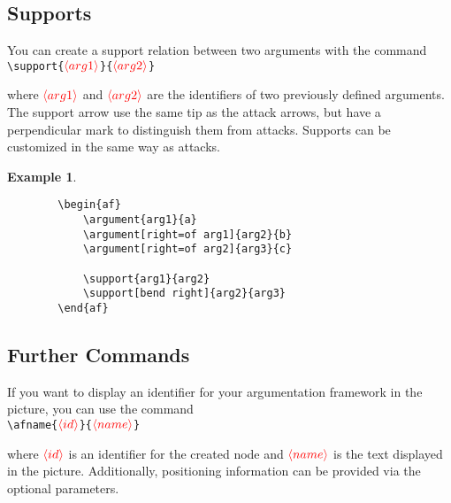 \documentclass{article}
\newcommand{\opt}[2][red]{\ensuremath{\textcolor{#1}{\langle #2\rangle}}}
\newtheorem{example}{Example}
\begin{document}
\subsection{Supports}
    You can create a support relation between two arguments with the command\\

    \noindent
    \verb|\support{|\opt{arg1}\verb|}{|\opt{arg2}\verb|}|

    \begin{list}{}{\leftmargin=\parindent\rightmargin=0pt}
    \item where \opt{arg1} and \opt{arg2} are the identifiers of two previously defined arguments.
    The support arrow use the same tip as the attack arrows, but have a perpendicular mark to distinguish them from attacks.
    Supports can be customized in the same way as attacks.
    \end{list}
    \begin{example}~
    \begin{verbatim}
        \begin{af}
            \argument{arg1}{a}
            \argument[right=of arg1]{arg2}{b}
            \argument[right=of arg2]{arg3}{c}
    
            \support{arg1}{arg2}
            \support[bend right]{arg2}{arg3}
        \end{af}    
    \end{verbatim}

    \begin{center}
        \begin{af}
    
        \end{af}    
    \end{center}
    \end{example}


\subsection{Further Commands}
    If you want to display an identifier for your argumentation framework in the picture, you can use the command\\

    \noindent
    \verb|\afname{|\opt{id}\verb|}{|\opt{name}\verb|}|

    \begin{list}{}{\leftmargin=\parindent\rightmargin=0pt}
    \item where \opt{id} is an identifier for the created node and \opt{name} is the text displayed in the picture.
    Additionally, positioning information can be provided via the optional parameters.
    \end{list}
\end{document}
